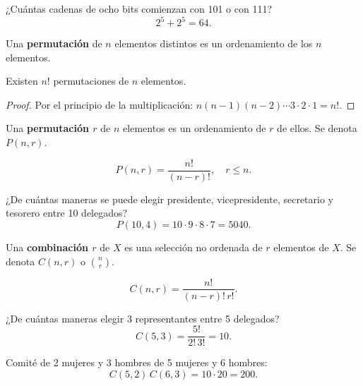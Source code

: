 \begin{ejemplo}
¿Cuántas cadenas de ocho bits comienzan con 101 o con 111?
\[
2^5 + 2^5 = 64.
\]
\end{ejemplo}

\begin{definicion}
Una \textbf{permutación} de $n$ elementos distintos es un ordenamiento de los $n$ elementos.
\end{definicion}

\begin{teorema}
Existen $n!$ permutaciones de $n$ elementos.
\end{teorema}
\begin{proof}
Por el principio de la multiplicación:
$n(n-1)(n-2)\cdots 3\cdot 2\cdot 1 = n!$.
\end{proof}

\begin{definicion}
Una \textbf{permutación $r$} de $n$ elementos es un ordenamiento de $r$ de ellos. Se denota $P(n,r)$.
\end{definicion}

\begin{teorema}
\[
P(n,r) = \frac{n!}{(n-r)!}, \quad r \leq n.
\]
\end{teorema}

\begin{ejemplo}
¿De cuántas maneras se puede elegir presidente, vicepresidente, secretario y tesorero entre 10 delegados?
\[
P(10,4) = 10\cdot 9\cdot 8\cdot 7 = 5040.
\]
\end{ejemplo}

\begin{definicion}
Una \textbf{combinación $r$} de $X$ es una selección no ordenada de $r$ elementos de $X$. Se denota $C(n,r)$ o $\binom{n}{r}$.
\end{definicion}

\begin{teorema}
\[
C(n,r) = \frac{n!}{(n-r)!\,r!}.
\]
\end{teorema}

\begin{ejemplo}
¿De cuántas maneras elegir 3 representantes entre 5 delegados?
\[
C(5,3) = \frac{5!}{2!\,3!} = 10.
\]
\end{ejemplo}

\begin{ejemplo}
Comité de 2 mujeres y 3 hombres de 5 mujeres y 6 hombres:
\[
C(5,2)\,C(6,3) = 10 \cdot 20 = 200.
\]
\end{ejemplo}

